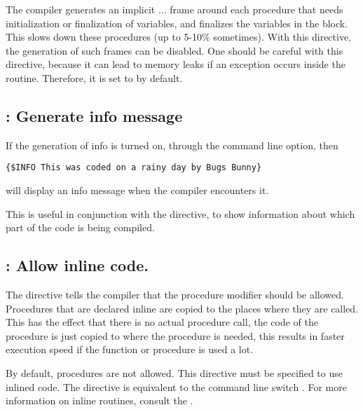 The compiler generates an implicit ... frame around
each procedure that needs initialization or finalization of variables, and
finalizes the variables in the  block. This
slows down these procedures (up to 5-10\% sometimes). 
With this directive, the generation of such frames can be disabled. 
One should be careful with this directive, because it can lead to memory 
leaks if an exception occurs inside the routine. 
Therefore, it is set to  by default.

\subsection{ : Generate info message}

If the generation of info is turned on, through the  command line
option, then
\begin{verbatim}
{$INFO This was coded on a rainy day by Bugs Bunny}
\end{verbatim}
will display an info message when the compiler encounters it.

This is useful in conjunction with the  directive, to show
information about which part of the code is being compiled.

\subsection{ : Allow inline code.}

The  directive tells the compiler that the 
procedure modifier should be allowed. Procedures that are declared inline
are copied to the places where they are called. This has the effect that
there is no actual procedure call, the code of the procedure is just copied
to where the procedure is needed, this results in faster execution speed if
the function or procedure is used a lot.

By default,  procedures are not allowed. This directive must be 
specified to use inlined code. The directive is equivalent to the command line
 switch . For more information on inline routines, consult the .

